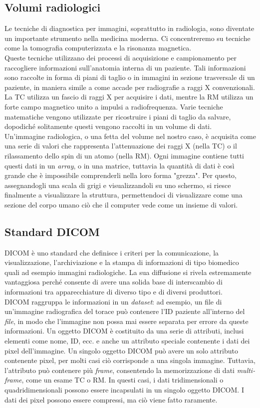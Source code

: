 \subsection{Volumi radiologici}\label{sec:volumi-radiologici}
Le tecniche di diagnostica per immagini, soprattutto in radiologia, sono diventate un importante strumento nella medicina moderna. Ci concentreremo su tecniche come la tomografia computerizzata e la risonanza magnetica.
\\
Queste tecniche utilizzano dei processi di acquisizione e campionamento per raccogliere informazioni sull'anatomia interna di un paziente. Tali informazioni sono raccolte in forma di piani di taglio o in immagini in sezione trasversale di un paziente, in maniera simile a come accade per radiografie a raggi X convenzionali. La TC utilizza un fascio di raggi X per acquisire i dati, mentre la RM utilizza un forte campo magnetico unito a  impulsi a radiofrequenza. Varie tecniche matematiche vengono utilizzate per ricostruire i piani di taglio da salvare, dopodiché solitamente questi vengono raccolti in un volume di dati.
\\
Un'immagine radiologica, o una fetta del volume nel nostro caso, è acquisita come una serie di valori che rappresenta l'attenuazione dei raggi X (nella TC) o il rilassamento dello spin di un atomo (nella RM). Ogni immagine contiene tutti questi dati in un \emph{array}, o in una matrice, tuttavia la quantità di dati è così grande che è impossibile comprenderli nella loro forma "grezza". Per questo, assegnandogli una scala di grigi e visualizzandoli su uno schermo, si riesce finalmente a visualizzare la struttura, permettendoci di visualizzare come una sezione del corpo umano ciò che il computer vede come un insieme di valori.

\subsection{Standard DICOM}
DICOM è uno standard che definisce i criteri per la comunicazione, la visualizzazione, l'archiviazione e la stampa di informazioni di tipo biomedico quali ad esempio immagini radiologiche. La sua diffusione si rivela estremamente vantaggiosa perché consente di avere una solida base di interscambio di informazioni tra apparecchiature di diverso tipo e di diversi produttori.
\\
DICOM raggruppa le informazioni in un \emph{dataset}: ad esempio, un file di un'immagine radiografica del torace può contenere l'ID paziente all'interno del \emph{file}, in modo che l'immagine non possa mai essere separata per errore da queste informazioni. Un oggetto DICOM è costituito da una serie di attributi, inclusi elementi come nome, ID, ecc. e anche un attributo speciale contenente i dati dei pixel dell'immagine. Un singolo oggetto DICOM può avere un solo attributo contenente pixel, per molti casi ciò corrisponde a una singola immagine. Tuttavia, l'attributo può contenere più \emph{frame}, consentendo la memorizzazione di dati \emph{multi-frame}, come un esame TC o RM. In questi casi, i dati tridimensionali o quadridimensionali possono essere incapsulati in un singolo oggetto DICOM. I dati dei pixel possono essere compressi, ma ciò viene fatto raramente.

